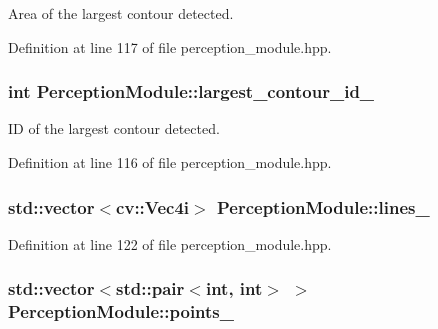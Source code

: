 Area of the largest contour detected. 



Definition at line 117 of file perception\+\_\+module.\+hpp.

\subsubsection[{\texorpdfstring{largest\+\_\+contour\+\_\+id\+\_\+}{largest_contour_id_}}]{\setlength{\rightskip}{0pt plus 5cm}int Perception\+Module\+::largest\+\_\+contour\+\_\+id\+\_\+\hspace{0.3cm}{\ttfamily [private]}}\hypertarget{class_perception_module_a7936595913566cc046bcecfe3e9803d9}{}\label{class_perception_module_a7936595913566cc046bcecfe3e9803d9}


ID of the largest contour detected. 



Definition at line 116 of file perception\+\_\+module.\+hpp.

\subsubsection[{\texorpdfstring{lines\+\_\+}{lines_}}]{\setlength{\rightskip}{0pt plus 5cm}std\+::vector$<$cv\+::\+Vec4i$>$ Perception\+Module\+::lines\+\_\+\hspace{0.3cm}{\ttfamily [private]}}\hypertarget{class_perception_module_af7aab087aaf76ccf57ef68a8001dc530}{}\label{class_perception_module_af7aab087aaf76ccf57ef68a8001dc530}


Definition at line 122 of file perception\+\_\+module.\+hpp.

\subsubsection[{\texorpdfstring{points\+\_\+}{points_}}]{\setlength{\rightskip}{0pt plus 5cm}std\+::vector$<$std\+::pair$<$int, int$>$ $>$ Perception\+Module\+::points\+\_\+\hspace{0.3cm}{\ttfamily [private]}}\hypertarget{class_perception_module_a9cfd32e708d852e96b117e44643bbfad}{}\label{class_perception_module_a9cfd32e708d852e96b117e44643bbfad}


